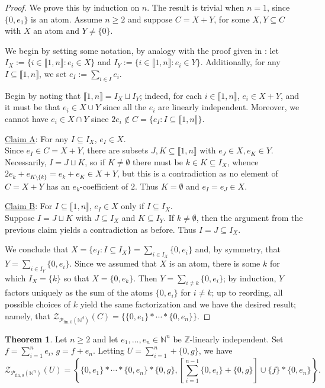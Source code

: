 \documentclass{report}
\newcommand{\NN}{\mathbb{N}}
\renewcommand{\P}{\mathcal{P}}
\newcommand{\ZZ}{\mathbb{Z}}
\newcommand{\Z}{\mathcal{Z}}
\newcommand{\llb}{\llbracket}
\newcommand{\rrb}{\rrbracket}
\newcommand{\fon}{{\textrm{fin}, 0}}
\renewcommand{\:}{\text{:}}
\theoremstyle{definition}
\newtheorem{thm}[defn]{Theorem}
\begin{document}
\begin{proof}
We prove this by induction on $n$.
The result is trivial when $n=1$, since $\{0,e_1\}$ is an atom.
Assume $n\ge 2$ and suppose $C = X + Y$, for some $X,Y\subseteq C$ with $X$ an atom and $Y\neq\{0\}$.

We begin by setting some notation, by analogy with the proof given in \cite{fan-tringali18}: let $I_X:=\{i\in \llb1,n\rrb : e_i\in X\}$ and $I_Y := \{i\in \llb1,n\rrb: e_i\in Y\}$.
Additionally, for any $I\subseteq \llb1,n\rrb$, we set $e_I := \sum_{i\in I} e_i$.

Begin by noting that $\llb 1,n \rrb = I_X \sqcup I_Y$; indeed, for each $i\in\llb 1,n \rrb$, $e_i\in X+Y$, and it must be that $e_i\in X\cup Y$ since all the $e_i$ are linearly independent.  
Moreover, we cannot have $e_i\in X\cap Y$ since $2e_i \notin C = \{e_I : I\subseteq \llb 1,n \rrb \}$.

\noindent\underline{Claim A}: For any $I\subseteq I_X$, $e_I\in X$.\\
Since $e_I\in C = X+Y$, there are subsets $J,K\subseteq \llb 1,n \rrb$ with $e_J\in X, e_K \in Y$.
Necessarily, $I = J\sqcup K$, so if $K\neq \emptyset$ there must be $k\in K\subseteq I_X$, whence $2e_k + e_{K\setminus\{k\}} = e_k + e_K\in X+Y$, but this is a contradiction as no element of $C = X+Y$ has an $e_k$-coefficient of $2$.
Thus $K = \emptyset$ and $e_I = e_J \in X$.

\noindent\underline{Claim B}: For $I\subseteq \llb 1,n \rrb$, $e_I\in X$ only if $I\subseteq I_X$.\\
Suppose $I = J\sqcup K$ with $J\subseteq I_X$ and $K\subseteq I_Y$.
If $k\neq \emptyset$, then the argument from the previous claim yields a contradiction as before.
Thus $I = J\subseteq I_X$.

We conclude that $X = \{ e_I : I\subseteq I_X\} = \sum_{i\in I_X} \{0,e_i\}$ and, by symmetry, that $Y = \sum_{i\in I_Y} \{0,e_i\}$.
Since we assumed that $X$ is an atom, there is some $k$ for which $I_X = \{k\}$ so that $X = \{0,e_k\}$.
Then $Y = \sum_{i\neq k} \{0,e_i\}$; by induction, $Y$ factors uniquely as the sum of the atoms $\{0,e_i\}$ for $i\neq k$; up to reording, all possible choices of $k$ yield the same factorization and we have the desired result; namely, that $\Z_{\P_\fon(\NN^d)}(C) = \{ \{0,e_1\}*\cdots*\{0,e_n\} \}$.
\end{proof}

\begin{thm} \label{thm:2n-length-set}
Let $n\ge 2$ and let $e_1,\dots, e_n\in \NN^n$ be $\ZZ$-linearly independent.
Set $f = \sum_{i=1}^n e_i$, $g=f+e_n$.%
Letting $U = \sum_{i=1}^n + \{0,g\}$, we have 
\[\Z_{\P_\fon(\NN^n)}(U) = \left\{ \{0,e_1\}*\cdots*\{0,e_n\}*\{0,g\}, \left[\sum_{i=1}^{n-1}\{0,e_i\}+\{0,g\}\right]\cup\{f\} * \{0,e_n\} \right\}. \]
\end{thm}
\end{document}
